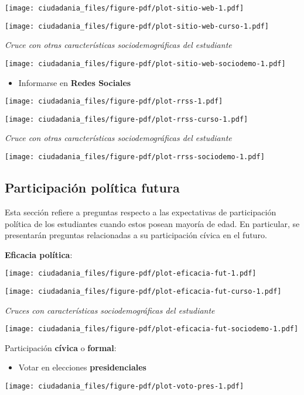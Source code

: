 \documentclass[
  letterpaper,
  DIV=11,
  numbers=noendperiod]{scrreprt}
\providecommand{\tightlist}{%
  \setlength{\itemsep}{0pt}\setlength{\parskip}{0pt}}\usepackage{longtable,booktabs,array}
\begin{document}
\texttt{[image: ciudadania\_files/figure-pdf/plot-sitio-web-1.pdf]}

\texttt{[image: ciudadania\_files/figure-pdf/plot-sitio-web-curso-1.pdf]}

\emph{Cruce con otras características sociodemográficas del estudiante}

\texttt{[image: ciudadania\_files/figure-pdf/plot-sitio-web-sociodemo-1.pdf]}

\begin{itemize}
\tightlist
\item
  Informarse en \textbf{Redes Sociales}
\end{itemize}

\texttt{[image: ciudadania\_files/figure-pdf/plot-rrss-1.pdf]}

\texttt{[image: ciudadania\_files/figure-pdf/plot-rrss-curso-1.pdf]}

\emph{Cruce con otras características sociodemográficas del estudiante}

\texttt{[image: ciudadania\_files/figure-pdf/plot-rrss-sociodemo-1.pdf]}

\subsection{Participación política
futura}\label{participaciuxf3n-poluxedtica-futura}

Esta sección refiere a preguntas respecto a las expectativas de
participación política de los estudiantes cuando estos posean mayoría de
edad. En particular, se presentarán preguntas relacionadas a su
participación cívica en el futuro.

\textbf{Eficacia política}:

\texttt{[image: ciudadania\_files/figure-pdf/plot-eficacia-fut-1.pdf]}

\texttt{[image: ciudadania\_files/figure-pdf/plot-eficacia-fut-curso-1.pdf]}

\emph{Cruces con características sociodemográficas del estudiante}

\texttt{[image: ciudadania\_files/figure-pdf/plot-eficacia-fut-sociodemo-1.pdf]}

Participación \textbf{cívica} o \textbf{formal}:

\begin{itemize}
\tightlist
\item
  Votar en elecciones \textbf{presidenciales}
\end{itemize}

\texttt{[image: ciudadania\_files/figure-pdf/plot-voto-pres-1.pdf]}
\end{document}
